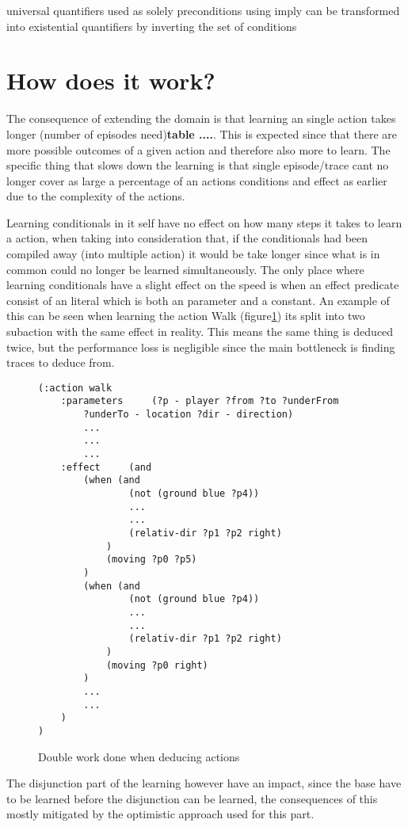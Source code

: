 	
	universal quantifiers used as solely preconditions using imply can be transformed into existential quantifiers by inverting the set of conditions

	
\section{How does it work?}	
	The consequence of extending the domain is that learning an single action takes longer (number of episodes need)\textbf{table ....}. This is expected since that there are more possible outcomes of a given action and therefore also more to learn. The specific thing that slows down the learning is that single episode/trace cant no longer cover as large a percentage of an actions conditions and effect as earlier due to the complexity of the actions.
	
	Learning conditionals in it self have no effect on how many steps it takes to learn a action, when taking into consideration that, if the conditionals had been compiled away (into multiple action) it would be take longer since what is in common could no longer be learned simultaneously. The only place where learning conditionals have a slight effect on the speed is when an effect predicate consist of an literal which is both an parameter and a constant. An example of this can be seen when learning the action Walk (figure\ref{double}) its split into two subaction with the same effect in reality. This means the same thing is deduced twice, but the performance loss is negligible since the main bottleneck is finding traces to deduce from.  
	\begin{figure}
		\caption{Double work done when deducing actions}
		\label{double}
		\begin{lstlisting}
(:action walk
	:parameters  	(?p - player ?from ?to ?underFrom 
		?underTo - location ?dir - direction)
		...
		...
		...
	:effect 	(and
		(when (and
				(not (ground blue ?p4))
				...
				...
				(relativ-dir ?p1 ?p2 right)
			)
			(moving ?p0 ?p5)
		)
		(when (and
				(not (ground blue ?p4))
				...
				...
				(relativ-dir ?p1 ?p2 right)
			)
			(moving ?p0 right)
		)	
		...
		...
	)
)
		\end{lstlisting}
	\end{figure}
	 The disjunction part of the learning however have an impact, since the base have to be learned before the disjunction can be learned, the consequences of this mostly mitigated by the optimistic approach used for this part.
	
